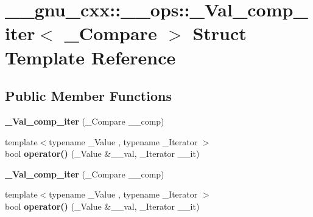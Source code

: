 \hypertarget{struct____gnu__cxx_1_1____ops_1_1__Val__comp__iter}{\section{\+\_\+\+\_\+gnu\+\_\+cxx\+:\+:\+\_\+\+\_\+ops\+:\+:\+\_\+\+Val\+\_\+comp\+\_\+iter$<$ \+\_\+\+Compare $>$ Struct Template Reference}
\label{struct____gnu__cxx_1_1____ops_1_1__Val__comp__iter}
}
\subsection*{Public Member Functions}
\begin{DoxyCompactItemize}
\item 
\hypertarget{struct____gnu__cxx_1_1____ops_1_1__Val__comp__iter_a8f1dcf642797fa9c1303834e217c6113}{{\bfseries \+\_\+\+Val\+\_\+comp\+\_\+iter} (\+\_\+\+Compare \+\_\+\+\_\+comp)}\label{struct____gnu__cxx_1_1____ops_1_1__Val__comp__iter_a8f1dcf642797fa9c1303834e217c6113}

\item 
\hypertarget{struct____gnu__cxx_1_1____ops_1_1__Val__comp__iter_aac8f0452431d560a49d95c4cf595649a}{{\footnotesize template$<$typename \+\_\+\+Value , typename \+\_\+\+Iterator $>$ }\\bool {\bfseries operator()} (\+\_\+\+Value \&\+\_\+\+\_\+val, \+\_\+\+Iterator \+\_\+\+\_\+it)}\label{struct____gnu__cxx_1_1____ops_1_1__Val__comp__iter_aac8f0452431d560a49d95c4cf595649a}

\item 
\hypertarget{struct____gnu__cxx_1_1____ops_1_1__Val__comp__iter_a8f1dcf642797fa9c1303834e217c6113}{{\bfseries \+\_\+\+Val\+\_\+comp\+\_\+iter} (\+\_\+\+Compare \+\_\+\+\_\+comp)}\label{struct____gnu__cxx_1_1____ops_1_1__Val__comp__iter_a8f1dcf642797fa9c1303834e217c6113}

\item 
\hypertarget{struct____gnu__cxx_1_1____ops_1_1__Val__comp__iter_aac8f0452431d560a49d95c4cf595649a}{{\footnotesize template$<$typename \+\_\+\+Value , typename \+\_\+\+Iterator $>$ }\\bool {\bfseries operator()} (\+\_\+\+Value \&\+\_\+\+\_\+val, \+\_\+\+Iterator \+\_\+\+\_\+it)}\label{struct____gnu__cxx_1_1____ops_1_1__Val__comp__iter_aac8f0452431d560a49d95c4cf595649a}

\end{DoxyCompactItemize}
